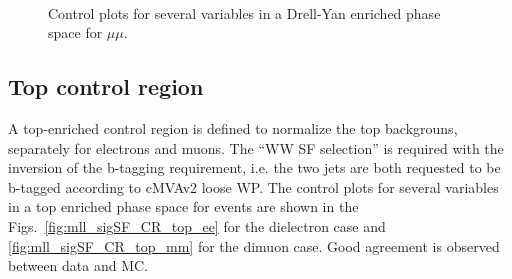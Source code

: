 \begin{figure}[h]
\\

\caption{Control plots for several variables in a Drell-Yan enriched phase space for $\mu \mu$.}
    \label{fig:mll_sigSF_CR_DY_mm}
\end{figure}

\newpage
\clearpage
\subsection*{Top control region}
A top-enriched control region is defined to normalize the top backgrouns,
separately for electrons and muons.
The ``WW SF selection'' is required with the inversion of the b-tagging
requirement, i.e. the two jets are both requested to be b-tagged according to
cMVAv2 loose WP.
The control plots for several variables in a top enriched phase space for events are shown in
the Figs.~\ref{fig:mll_sigSF_CR_top_ee} for the dielectron case and
\ref{fig:mll_sigSF_CR_top_mm} for the dimuon case. Good agreement is observed
between data and MC.


